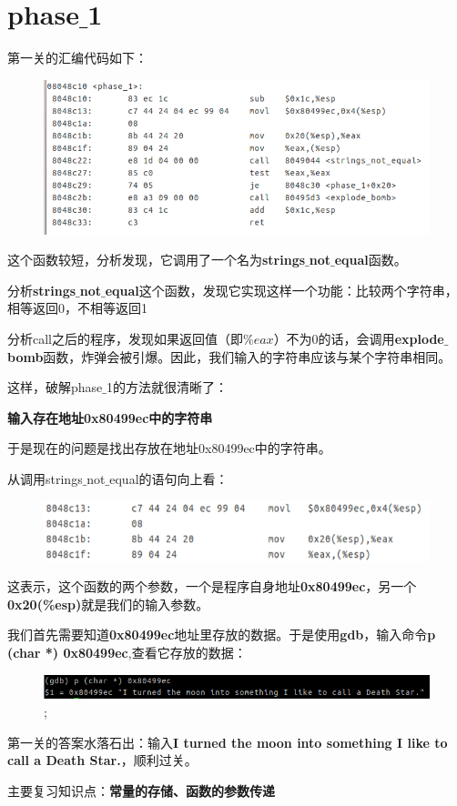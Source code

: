 \section{phase$\_$1}
	第一关的汇编代码如下：
	\begin{figure}[h]
		\centering
			\includegraphics[scale=0.77]{images/phase_1.png}
	\end{figure}
	这个函数较短，分析发现，它调用了一个名为\textbf{strings$\_$not$\_$equal}函数。
	
	分析\textbf{strings$\_$not$\_$equal}这个函数，发现它实现这样一个功能：比较两个字符串，相等返回0，不相等返回1
	
	分析call之后的程序，发现如果返回值（即$\%eax$）不为0的话，会调用\textbf{explode$\_$bomb}函数，炸弹会被引爆。因此，我们输入的字符串应该与某个字符串相同。
	
	这样，破解phase$\_$1的方法就很清晰了：

		\begin{center}
			\textbf{输入存在地址0x80499ec中的字符串}
		\end{center}

	于是现在的问题是找出存放在地址0x80499ec中的字符串。
	
	从调用strings$\_$not$\_$equal的语句向上看：
	\begin{figure}[h]
		\centering
			\includegraphics[scale=0.77]{images/phase_1_part_0.png}	
	\end{figure}
	
	这表示，这个函数的两个参数，一个是程序自身地址\textbf{0x80499ec}，另一个\textbf{0x20(\%esp)}就是我们的输入参数。
	
	我们首先需要知道\textbf{0x80499ec}地址里存放的数据。于是使用\textbf{gdb}，输入命令\textbf{p (char *) 0x80499ec},查看它存放的数据：
	\begin{figure}[h]
		\centering
			\includegraphics[scale=0.7]{images/phase_1_part_1.png};
	\end{figure}
	
	第一关的答案水落石出：输入\textbf{I turned the moon into something I like to call a Death Star.}，顺利过关。
	
	主要复习知识点：\textbf{常量的存储、函数的参数传递}
	